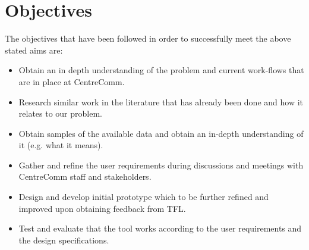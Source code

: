 \section{Objectives}
The objectives that have been followed in order to successfully meet the above stated aims are:
\begin{itemize}
	\item Obtain an in depth understanding of the problem and current work-flows that are in place at CentreComm.
	\item Research similar work in the literature that has already been done and how it relates to our problem.
	\item Obtain samples of the available data and obtain an in-depth understanding of it (e.g. what it means).
	\item Gather and refine the user requirements during discussions and meetings with CentreComm staff and stakeholders.
	\item Design and develop initial prototype which to be further refined and improved upon obtaining feedback from TFL.
	\item Test and evaluate that the tool works according to the user requirements and the design specifications.
\end{itemize}


